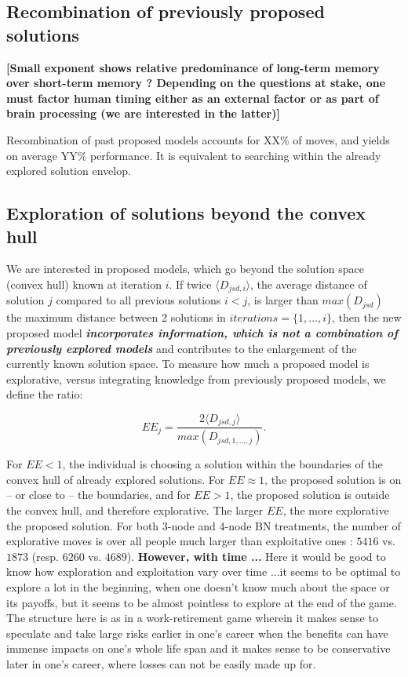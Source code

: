 \subsection{Recombination of previously proposed solutions}

{\bf [Small exponent shows relative predominance of long-term memory over short-term memory ? Depending on the questions at stake, one must factor human timing either as an external factor or as part of brain processing (we are interested in the latter)]}

Recombination of past proposed models accounts for XX\% of moves, and yields on average  YY\% performance. It is equivalent to searching within the already explored solution envelop.


\subsection{Exploration of solutions beyond the convex hull}
We are interested in proposed models, which go beyond the solution space (convex hull) known at iteration $i$. If twice $\langle D_{jsd,i} \rangle$, the average distance of solution $j$ compared to all previous solutions $i < j$, is larger than $ max(D_{jsd})$ the maximum distance between 2 solutions in $iterations = \{1,...,i\}$, then the new proposed model {\it {\bf incorporates information, which is not a combination of previously explored models}} and contributes to the enlargement of the currently known solution space. To measure how much a proposed model is explorative, versus integrating knowledge from previously proposed models, we define the ratio:

\begin{equation}
EE_{j} = \frac{2 \langle D_{jsd,j} \rangle}{max(D_{jsd,1,...,j})}.
\end{equation}

For $EE < 1$, the individual is choosing a solution within the boundaries of the convex hull of already explored solutions. For $EE \approx 1$, the proposed solution is on -- or close to -- the boundaries, and for $EE > 1$, the proposed solution is outside the convex hull, and therefore explorative. The larger $EE$, the more explorative the proposed solution. For both 3-node and 4-node BN treatments,  the number of explorative moves is over all people much larger than exploitative ones :  $5416$ vs. $1873$ (resp. $6260$ vs. $4689$). {\bf However, with time ...} Here it would be good to know how exploration and exploitation vary over time ...it seems to be optimal to explore a lot in the beginning, when one doesn't know much about the space or its payoffs, but it seems to be almost pointless to explore at the end of the game. The structure here is as in a work-retirement game wherein it makes sense to speculate and take large risks earlier in one's career when the benefits can have immense impacts on one's whole life span and it makes sense to be conservative later in one's career, where losses can not be easily made up for.    


